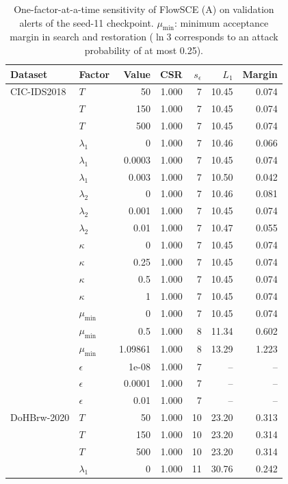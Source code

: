 \begin{table}[t]
\centering\footnotesize
\caption{One-factor-at-a-time sensitivity of FlowSCE (A) on validation alerts of the seed-11 checkpoint. $\mu_{\min}$: minimum acceptance margin in search and restoration ($\ln 3$ corresponds to an attack probability of at most 0.25).}
\label{tab:a-sensitivity}
\begin{tabular}{@{}llrrrrr@{}}
\toprule
Dataset & Factor & Value & CSR & $s_\epsilon$ & $L_1$ & Margin \\
\midrule
CIC-IDS2018 & $T$ & 50 & 1.000 & 7 & 10.45 & 0.074 \\
 & $T$ & 150 & 1.000 & 7 & 10.45 & 0.074 \\
 & $T$ & 500 & 1.000 & 7 & 10.45 & 0.074 \\
 & $\lambda_1$ & 0 & 1.000 & 7 & 10.46 & 0.066 \\
 & $\lambda_1$ & 0.0003 & 1.000 & 7 & 10.45 & 0.074 \\
 & $\lambda_1$ & 0.003 & 1.000 & 7 & 10.50 & 0.042 \\
 & $\lambda_2$ & 0 & 1.000 & 7 & 10.46 & 0.081 \\
 & $\lambda_2$ & 0.001 & 1.000 & 7 & 10.45 & 0.074 \\
 & $\lambda_2$ & 0.01 & 1.000 & 7 & 10.47 & 0.055 \\
 & $\kappa$ & 0 & 1.000 & 7 & 10.45 & 0.074 \\
 & $\kappa$ & 0.25 & 1.000 & 7 & 10.45 & 0.074 \\
 & $\kappa$ & 0.5 & 1.000 & 7 & 10.45 & 0.074 \\
 & $\kappa$ & 1 & 1.000 & 7 & 10.45 & 0.074 \\
 & $\mu_{\min}$ & 0 & 1.000 & 7 & 10.45 & 0.074 \\
 & $\mu_{\min}$ & 0.5 & 1.000 & 8 & 11.34 & 0.602 \\
 & $\mu_{\min}$ & 1.09861 & 1.000 & 8 & 13.29 & 1.223 \\
 & $\epsilon$ & 1e-08 & 1.000 & 7 & -- & -- \\
 & $\epsilon$ & 0.0001 & 1.000 & 7 & -- & -- \\
 & $\epsilon$ & 0.01 & 1.000 & 7 & -- & -- \\
\midrule
DoHBrw-2020 & $T$ & 50 & 1.000 & 10 & 23.20 & 0.313 \\
 & $T$ & 150 & 1.000 & 10 & 23.20 & 0.314 \\
 & $T$ & 500 & 1.000 & 10 & 23.20 & 0.314 \\
 & $\lambda_1$ & 0 & 1.000 & 11 & 30.76 & 0.242 \\

\end{tabular}
\end{table}
